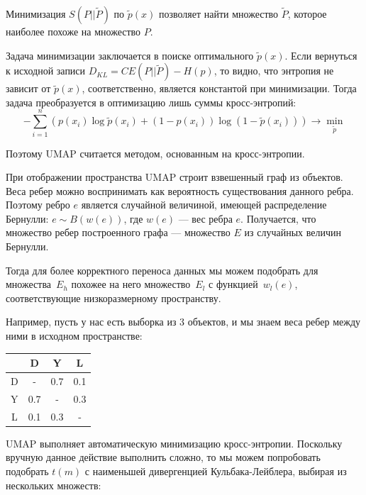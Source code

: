 Минимизация $S(P||\tilde P)$ по $\tilde p(x)$ позволяет найти множество $\tilde P$, которое наиболее похоже на множество $P$.

Задача минимизации заключается в поиске оптимального $\tilde p(x)$. Если вернуться к исходной записи $D_{KL} = CE(P||\tilde P) - H(p)$, то видно, что энтропия не зависит от $\tilde p(x)$, соответственно, является константой при минимизации. Тогда задача преобразуется в оптимизацию лишь суммы кросс-энтропий:
\[- \sum_{i=1}^n \left(p(x_i)\log \tilde p(x_i) + (1 - p(x_i))\log (1 - \tilde p(x_i))\right) \rightarrow \min_{\tilde p}\]

Поэтому UMAP считается методом, основанным на кросс-энтропии.

При отображении пространства UMAP строит взвешенный граф из объектов. Веса ребер можно воспринимать как вероятность существования данного ребра. Поэтому ребро $e$ является случайной величиной, имеющей распределение Бернулли: $e \sim B(w(e))$, где $w(e)$ --- вес ребра $e$. Получается, что множество ребер построенного графа --- множество $E$ из случайных величин Бернулли.

Тогда для более корректного переноса данных мы можем подобрать для множества~$E_h$ похожее на него множество~$E_l$ с функцией~$w_l(e)$, соответствующие низкоразмерному пространству.

Например, пусть у нас есть выборка из 3 объектов, и мы знаем веса ребер между ними в исходном пространстве:
\begin{center}
	\begin{tabular}{|c||c|c|c|}
		\hline
		& D & Y & L\\
		\hline
		\hline
		D & - & 0.7 & 0.1\\
		\hline
		Y & 0.7 & - & 0.3\\
		\hline
		L & 0.1 & 0.3 & -\\
		\hline
	\end{tabular}
\end{center}

UMAP выполняет автоматическую минимизацию кросс-энтропии. Поскольку вручную данное действие выполнить сложно, то мы можем попробовать подобрать $t(m)$ с наименьшей дивергенцией Кульбака-Лейблера, выбирая из нескольких множеств:

